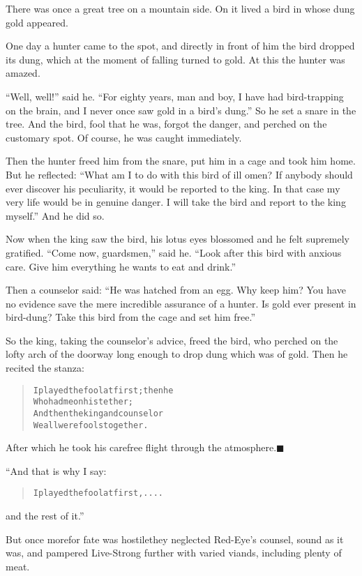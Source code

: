 \documentclass[article, twoside, 14pt]{memoir}
\newcommand{\qed}{\hfill \ensuremath{\blacksquare}}
\renewenvironment{verbatim}{%
\begin{quote}%
\vskip -10pt%
\begin{alltt}\normalfont\large}{\end{alltt}%
\end{quote}%
\vskip -10pt
} %
\begin{document}
\label{s61}

There was once a great tree on a mountain side. On it lived a bird
in whose dung gold appeared.

One day a hunter came to the spot, and directly in front of him the
bird dropped its dung, which at the moment of falling turned to
gold. At this the hunter was amazed.

``Well, well!'' said he.
``For eighty years, man and boy, I have had bird-trapping on the brain, and I never once saw gold in a bird's dung.''
So he set a snare in the tree. And the bird, fool that he was,
forgot the danger, and perched on the customary spot. Of course, he
was caught immediately.

Then the hunter freed him from the snare, put him in a cage and
took him home. But he reflected:
``What am I to do with this bird of ill omen? If anybody should ever discover his peculiarity, it would be reported to the king. In that case my very life would be in genuine danger. I will take the bird and report to the king myself.''
And he did so.

Now when the king saw the bird, his lotus eyes blossomed and he
felt supremely gratified. ``Come now, guardsmen,'' said he.
``Look after this bird with anxious care. Give him everything he wants to eat and drink.''

Then a counselor said:
``He was hatched from an egg. Why keep him? You have no evidence save the mere incredible assurance of a hunter. Is gold ever present in bird-dung? Take this bird from the cage and set him free.''

So the king, taking the counselor's advice, freed the bird, who
perched on the lofty arch of the doorway long enough to drop dung
which was of gold. Then he recited the stanza:

\begin{verbatim}
I played the fool at first; then he
    Who had me on his tether;
And then the king and counselor{\textemdash}
    We all were fools together.
\end{verbatim}
After which he took his carefree flight through the
atmosphere.\hyperref[s61]{\qed}

“And that is why I say:

\begin{verbatim}
I played the fool at first, ....
\end{verbatim}
and the rest of it.”

But once more{\textemdash}for fate was hostile{\textemdash}they neglected Red-Eye's
counsel, sound as it was, and pampered Live-Strong further with
varied viands, including plenty of meat.
\end{document}
